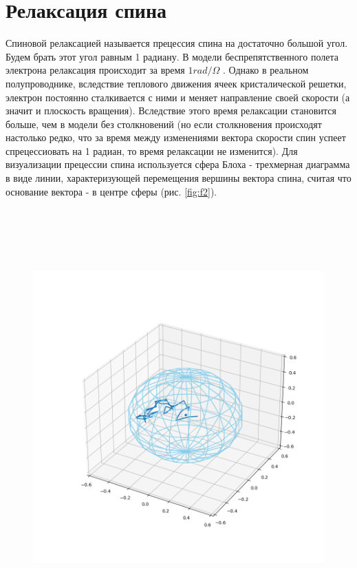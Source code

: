 \documentclass[12pt,oneside]{book}
\begin{document}
{{\section{Релаксация спина}
	Спиновой релаксацией называется прецессия спина на достаточно большой угол. Будем брать этот угол равным 1 радиану.
	\newline
	В модели беспрепятственного полета электрона релаксация происходит за время ${1 rad/\Omega}$ . Однако в реальном полупроводнике, вследствие теплового движения ячеек кристалической решетки, электрон постоянно сталкивается с ними и меняет направление своей скорости (а значит и плоскость вращения). Вследствие этого время релаксации становится больше, чем в модели без столкновений (но если столкновения происходят настолько редко, что за время между изменениями вектора скорости спин успеет спрецессиовать на 1 радиан, то время релаксации не изменится). 
	\newline
	\newline
	Для визуализации прецессии спина используется сфера Блоха - трехмерная диаграмма в виде линии, характеризующей перемещения вершины вектора спина, считая что основание вектора - в центре сферы (рис. \ref{fig:f2}).
		\begin{figure}[h!]
		\centering
		\includegraphics[width = 16cm, height = 16cm]{img/Bloch_Sphere_1.png}

\end{figure}}}
\end{document}
